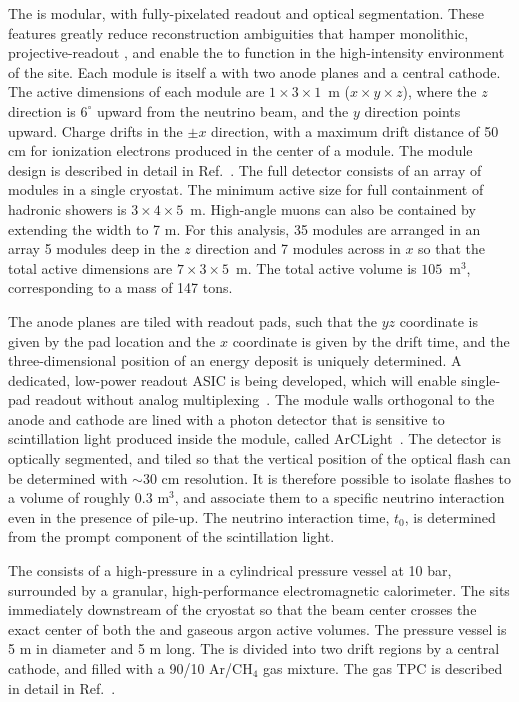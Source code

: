 The  is modular, with fully-\threed  pixelated readout and optical segmentation. These features greatly reduce reconstruction ambiguities that hamper monolithic, projective-readout , and enable the  to function in the high-intensity environment of the   site. Each module is itself a   with two anode planes and a central cathode. The active dimensions of each module are $1 \times 3 \times 1$~m ($x \times y \times z$), where the $z$ direction is $6^{\circ}$ upward from the neutrino beam, and the $y$ direction points upward. Charge drifts in the $\pm x$ direction, with a maximum drift distance of 50 cm for ionization electrons produced in the center of a module. The module design is described in detail in Ref.~\cite{Asaadi:2018xfh}. The full  detector consists of an array of modules in a single cryostat. The minimum active size for full containment of hadronic showers is $3 \times 4 \times 5$~m. High-angle muons can also be contained by extending the width to 7 m. For this analysis, 35 modules are arranged in an array 5 modules deep in the $z$ direction and 7 modules across in $x$ so that the total active dimensions are $7 \times 3 \times 5$~m. The total active  volume is $105$~m$^{3}$, corresponding to a mass of 147 tons.

The anode planes are tiled with readout pads, such that the $yz$ coordinate is given by the pad location and the $x$ coordinate is given by the drift time, and the three-dimensional position of an energy deposit is uniquely determined. A dedicated, low-power readout ASIC is being developed, which will enable single-pad readout without analog multiplexing~\cite{Dwyer:2018phu}. The module walls orthogonal to the anode and cathode are lined with a photon detector that is sensitive to scintillation light produced inside the module, called ArCLight~\cite{Auger:2017flc}. The detector is optically segmented, and tiled so that the vertical position of the optical flash can be determined with $\sim$30 cm resolution. It is therefore possible to isolate flashes to a volume of roughly 0.3 m$^{3}$, and associate them to a specific neutrino interaction even in the presence of pile-up. The neutrino interaction time, $t_{0}$, is determined from the prompt component of the scintillation light.

The  consists of a high-pressure  in a cylindrical pressure vessel at 10 bar, surrounded by a granular, high-performance electromagnetic calorimeter. The  sits immediately downstream of the  cryostat so that the beam center crosses the exact center of both the  and gaseous argon active volumes. The pressure vessel is 5 m in diameter and 5 m long. The  is divided into two drift regions by a central cathode, and filled with a 90/10 Ar/CH$_{4}$ gas mixture. The gas TPC is described in detail in Ref.~\cite{bib:docdb12388}.

